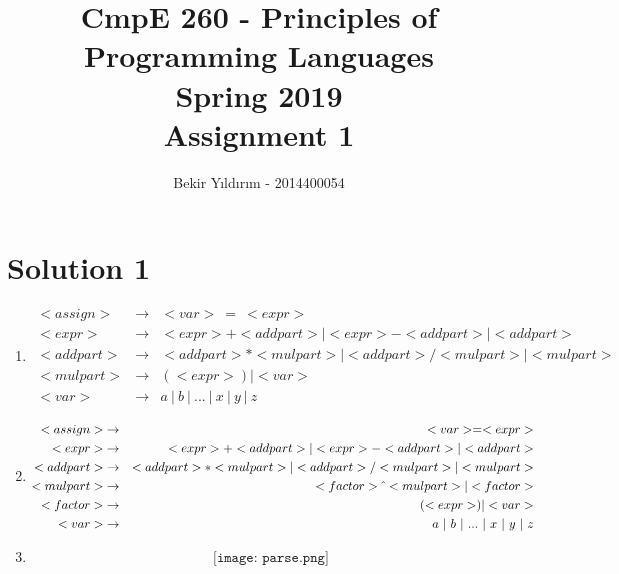 \documentclass[fleqn]{article}
\title{CmpE 260 - Principles of Programming Languages \\Spring 2019 \\Assignment 1}
\date{Bekir Yıldırım - 2014400054}
\begin{document}
\maketitle

\section*{Solution 1}

\begin{enumerate}[label=\textbf{\alph*)}]
\item
\begin{eqnarray*}
<assign> &\rightarrow& <var>\ =\ <expr>\\
<expr> &\rightarrow& <expr> + <addpart> | <expr> - <addpart> | <addpart> \\
<addpart> &\rightarrow&  <addpart> * <mulpart> | <addpart> / <mulpart> | <mulpart> \\
<mulpart> &\rightarrow& ( <expr> ) | <var> \\
<var> &\rightarrow& a\ |\ b\ |\ ...\ |\ x\ |\ y\ |\ z
\end{eqnarray*}

\item
\begin{eqnarray*}
<assign> &\rightarrow& <var> = <expr>\\
<expr> &\rightarrow& <expr> + <addpart> | <expr> - <addpart> | <addpart> \\
<addpart> &\rightarrow&  <addpart> * <mulpart> | <addpart> / <mulpart> | <mulpart> \\
<mulpart> &\rightarrow& <factor> \hat{\mkern6mu} <mulpart> | <factor> \\
<factor> &\rightarrow& ( <expr> ) | <var> \\
<var> &\rightarrow& a\ |\ b\ |\ ...\ |\ x\ |\ y\ |\ z
\end{eqnarray*}

\item
\begin{align*}
\texttt{[image: parse.png]}
\end{align*}
\end{enumerate}


\newpage
\end{document}
